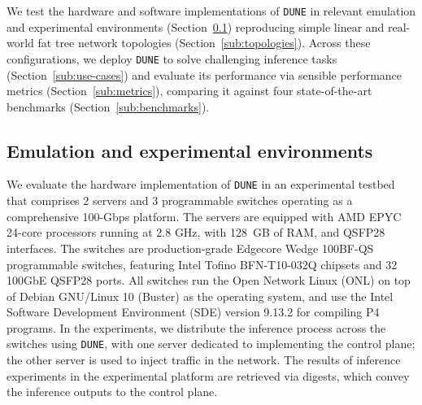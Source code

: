 \documentclass[journal]{IEEEtran}
\theoremstyle{plain} %
\newcommand{\td}[1]{\textcolor{red}{[TODO: #1]}}
\newcommand{\var}[1]{\texttt{\small{#1}}}
\newcommand{\name}{\texttt{\fontsize{9}{11}\selectfont DUNE}\xspace}
\begin{document}

We test the hardware and software implementations of \name in relevant emulation and experimental environments (Section~\ref{sub:testbed}) reproducing simple linear and real-world fat tree network topologies (Section~\ref{sub:topologies}). Across these configurations, we deploy \name to solve challenging inference tasks (Section~\ref{sub:use-cases}) and evaluate its performance via sensible performance metrics (Section~\ref{sub:metrics}), comparing it against four state-of-the-art benchmarks (Section~\ref{sub:benchmarks}).

\subsection{Emulation and experimental environments}
\label{sub:testbed}

We evaluate the hardware implementation of \name in an experimental testbed that comprises $2$ servers and $3$ programmable switches operating as a comprehensive 100-Gbps platform.
The servers are equipped with AMD EPYC 24-core processors running at 2.8 GHz, with 128 GB of RAM, and QSFP28 interfaces.
The switches are production-grade Edgecore Wedge 100BF-QS programmable switches, featuring Intel Tofino BFN-T10-032Q chipsets and 32 100GbE QSFP28 ports.
All switches run the Open Network Linux (ONL) on top of Debian GNU/Linux 10 (Buster) as the operating system, and use the Intel Software Development Environment (SDE) version 9.13.2 for compiling P4 programs.
In the experiments, we distribute the inference process across the switches using \name, with one server dedicated to implementing the control plane; the other server is used to inject traffic in the network.
The results of inference experiments in the experimental platform are retrieved via digests, which convey the inference outputs to the control plane.
\end{document}
